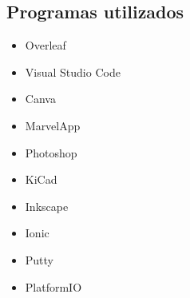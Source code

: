                 \subsection{Programas utilizados}
                    \begin{itemize} [label=•]
                        \setlength{\itemindent}{2.5em}
                            \item Overleaf
                            \item Visual Studio Code
                            \item Canva
                            \item MarvelApp
                            \item Photoshop
                            \item KiCad
                            \item Inkscape
                            \item Ionic
                            \item Putty
                            \item PlatformIO
                    \end{itemize}